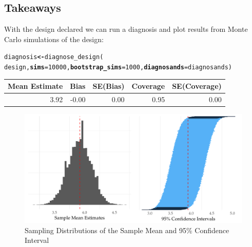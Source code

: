 \documentclass[11pt]{article}\usepackage[]{graphicx}\usepackage[]{color}
\makeatletter
\def\maxwidth{ %
  \ifdim\Gin@nat@width>\linewidth
    \linewidth
  \else
    \Gin@nat@width
  \fi
}
\newcommand{\hlnum}[1]{\textcolor[rgb]{0,0,0}{#1}}%
\newcommand{\hlstd}[1]{\textcolor[rgb]{0,0,0}{#1}}%
\newcommand{\hlkwb}[1]{\textcolor[rgb]{0.498,0,0.333}{\textbf{#1}}}%
\newcommand{\hlkwc}[1]{\textcolor[rgb]{0.498,0,0.333}{\textbf{#1}}}%
\newcommand{\hlkwd}[1]{\textcolor[rgb]{0,0,0}{#1}}%
\newenvironment{kframe}{%
 \def\at@end@of@kframe{}%
 \ifinner\ifhmode%
  \def\at@end@of@kframe{\end{minipage}}%
  \begin{minipage}{\columnwidth}%
 \fi\fi%
 \def\FrameCommand##1{\hskip\@totalleftmargin \hskip-\fboxsep
 \colorbox{shadecolor}{##1}\hskip-\fboxsep
     \hskip-\linewidth \hskip-\@totalleftmargin \hskip\columnwidth}%
 \MakeFramed {\advance\hsize-\width
   \@totalleftmargin\z@ \linewidth\hsize
   \@setminipage}}%
 {\par\unskip\endMakeFramed%
 \at@end@of@kframe}
\newenvironment{knitrout}{}{} %
\makeatother
\begin{document}
\subsection*{Takeaways} 

With the design declared we can run a diagnosis and plot results from Monte Carlo simulations of the design:

\begin{codedeclaration}
\begin{knitrout}\small
{}\color{fgcolor}\begin{kframe}
\begin{alltt}
\hlstd{diagnosis} \hlkwb{<-} \hlkwd{diagnose_design}\hlstd{(}
  \hlstd{design,} \hlkwc{sims} \hlstd{=} \hlnum{10000}\hlstd{,} \hlkwc{bootstrap_sims} \hlstd{=} \hlnum{1000}\hlstd{,} \hlkwc{diagnosands} \hlstd{= diagnosands)}
\end{alltt}
\end{kframe}
\end{knitrout}
\end{codedeclaration}

\begin{table}[ht]
\centering
\begin{tabular}{rrrrr}
  \hline
Mean Estimate & Bias & SE(Bias) & Coverage & SE(Coverage) \\ 
  \hline
3.92 & -0.00 & 0.00 & 0.95 & 0.00 \\ 
   \hline
\end{tabular}
\end{table}


\begin{knitrout}\small
{}\color{fgcolor}\begin{figure}
\includegraphics[width=\maxwidth]{figure/unnamed-chunk-6-1} \caption[Sampling Distributions of the Sample Mean and 95\% Confidence Interval]{Sampling Distributions of the Sample Mean and 95\% Confidence Interval}\label{fig:unnamed-chunk-6}
\end{figure}


\end{knitrout}
\end{document}

